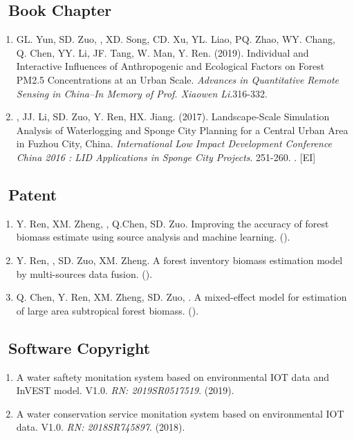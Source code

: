 \subsection*{\texorpdfstring{\faBook\ Book Chapter}{Book Chapter}}
\begin{enumerate}
\item
    GL. Yun, SD. Zuo, \Shaoqing, XD. Song, CD. Xu, YL. Liao, PQ. Zhao, WY. Chang, Q. Chen, YY. Li, JF. Tang, W. Man, Y. Ren. (2019).
	Individual and Interactive Influences of Anthropogenic and Ecological Factors on Forest PM2.5 Concentrations at an Urban Scale.
    \textit{Advances in Quantitative Remote Sensing in China–In Memory of Prof. Xiaowen Li}.316-332.
\item
    \Shaoqing, JJ. Li, SD. Zuo, Y. Ren, HX. Jiang. (2017).
	Landscape-Scale Simulation Analysis of Waterlogging and Sponge City Planning for a Central Urban Area in Fuzhou City, China.
    \textit{International Low Impact Development Conference China 2016 : LID Applications in Sponge City Projects}. 251-260.
    . [EI]
\end{enumerate}

\subsection*{\texorpdfstring{\faBook\ Patent}{Patent}}
\begin{enumerate}
\item
     Y. Ren, XM. Zheng, \Shaoqing, Q.Chen, SD. Zuo.
     Improving the accuracy of forest biomass estimate using source analysis and machine learning.
     (\Review).
\item
     Y. Ren, \Shaoqing, SD. Zuo, XM. Zheng.
     A forest inventory biomass estimation model by multi-sources data fusion.
     (\Review).
\item
     Q. Chen, Y. Ren, XM. Zheng, SD. Zuo, \Shaoqing.
     A mixed-effect model for estimation of large area subtropical forest biomass.
     (\Review).
\end{enumerate}

\subsection*{\texorpdfstring{\faBook\ Software Copyright}{Software Copyright}}
\begin{enumerate}
\item
    A water saftety monitation system based on environmental IOT data and InVEST model. V1.0.
    \textit{RN: 2019SR0517519}. (2019).
\item
    A water conservation service monitation system based on environmental IOT data. V1.0.
    \textit{RN: 2018SR745897}. (2018).
\end{enumerate}

